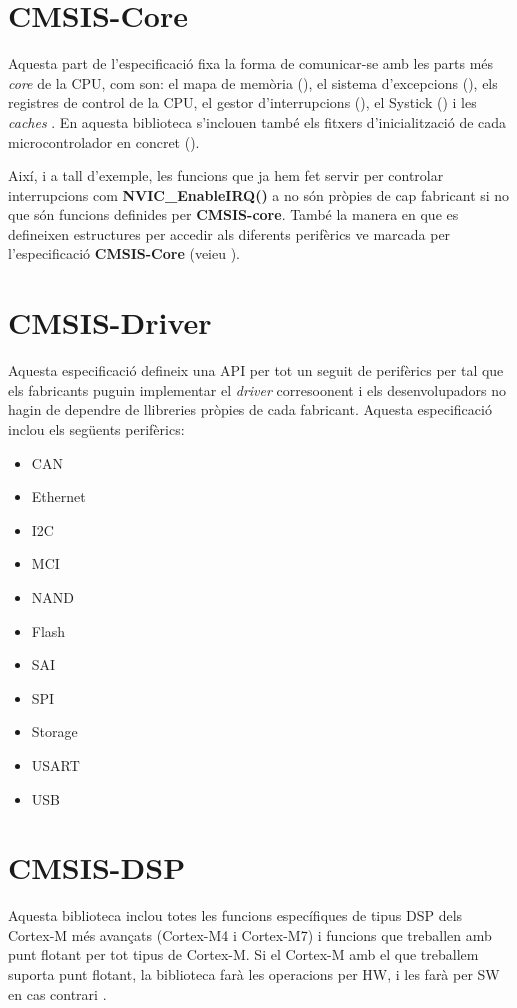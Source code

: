 \section{CMSIS-Core}
\label{sec:CMSIS-Core}
Aquesta part de l'especificació fixa la forma de comunicar-se amb les parts més {\em core} de la CPU, com son: el mapa de memòria (), el sistema d'excepcions (), els registres de control de la CPU, el gestor d'interrupcions (), el Systick () i les {\em caches} \cite{CMSIS-CORE}. En aquesta biblioteca s'inclouen també els fitxers d'inicialització de cada microcontrolador en concret ().

Així, i a tall d'exemple, les funcions que ja hem fet servir per controlar interrupcions com {\bf NVIC\_EnableIRQ()} a  no són pròpies de cap fabricant si no que són funcions definides per {\bf CMSIS-core}. També la manera en que es defineixen estructures per accedir als diferents perifèrics ve marcada per l'especificació {\bf CMSIS-Core} (veieu ).

\section{CMSIS-Driver}
Aquesta especificació defineix una \gls{API} per tot un seguit de perifèrics per tal que els fabricants puguin implementar el {\em driver} corresoonent i els desenvolupadors no hagin de dependre de llibreries pròpies de cada fabricant. Aquesta especificació inclou els següents perifèrics:
\begin{itemize}
 \item \gls{CAN}
 \item Ethernet
 \item I2C
 \item \gls{MCI}
 \item  NAND 
 \item Flash
 \item \gls{SAI}
 \item SPI
 \item Storage
 \item USART
 \item USB
\end{itemize}


\section{CMSIS-DSP}
\label{sec:CMSIS-DSP}
Aquesta biblioteca inclou totes les funcions específiques de tipus \gls{DSP} dels Cortex-M més avançats (Cortex-M4 i Cortex-M7) i funcions que treballen amb punt flotant per tot tipus de Cortex-M. Si el Cortex-M amb el que treballem suporta punt flotant, la biblioteca farà les operacions per HW, i les farà per SW en cas contrari \cite{CMSIS-DSP}\cite{AN0051}.

